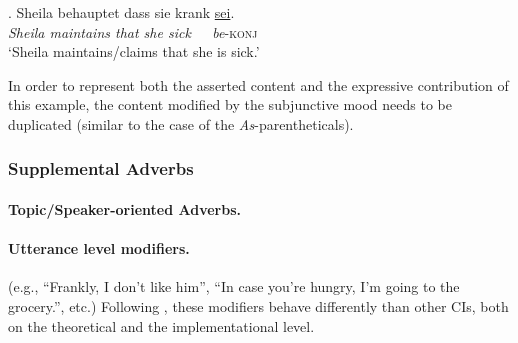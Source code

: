 \noindent\parbox[b]{\textwidth}{
\ex. Sheila behauptet dass sie krank \underline{sei}.\\
\textit{Sheila maintains that she sick~~~be}-\textsc{konj}\\
`Sheila maintains/claims that she is sick.'\\

}

\noindent In order to represent both the asserted content and the expressive
contribution of this example, the content modified by the subjunctive mood
needs to be duplicated (similar to the case of the
\textit{As}-parentheticals). 

\subsubsection{Supplemental Adverbs}

\paragraph{Topic/Speaker-oriented Adverbs.}


\paragraph{Utterance level modifiers.} (e.g., ``Frankly, I don't like him'',
``In case you're hungry, I'm going to the grocery.'', etc.) Following
\citet[pp.725-729]{amaral2007review}, these modifiers behave differently
than other CIs, both on the theoretical and the implementational level.


